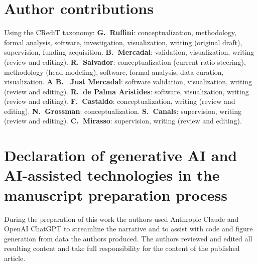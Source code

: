\documentclass[11pt,a4paper]{article}
\providecommand{\DIFaddtex}[1]{{\protect\color{blue} \sf #1}} %
\providecommand{\DIFdeltex}[1]{{\protect\color{red} \scriptsize #1}} %
\providecommand{\DIFaddbegin}{} %
\providecommand{\DIFaddend}{} %
\providecommand{\DIFdelbegin}{} %
\providecommand{\DIFdelend}{} %
\providecommand{\DIFadd}[1]{\texorpdfstring{\DIFaddtex{#1}}{#1}} %
\providecommand{\DIFdel}[1]{\texorpdfstring{\DIFdeltex{#1}}{}} %
\begin{document}
\section*{Author contributions}
Using the CRediT taxonomy: \textbf{G.~Ruffini}: conceptualization, methodology, formal
analysis, software, investigation, visualization, writing (original draft), supervision,
funding acquisition. \DIFdelbegin \DIFdel{\textbf{B.~Mercadal}: validation, visualization, writing (review
and editing). }\DIFdelend \textbf{R.~Salvador}: conceptualization (current-ratio steering),
methodology (head modeling), software, formal analysis, data curation, visualization.
\textbf{\DIFdelbegin \DIFdel{A}\DIFdelend \DIFaddbegin \DIFadd{B}\DIFaddend .~\DIFdelbegin \DIFdel{Just}\DIFdelend \DIFaddbegin \DIFadd{Mercadal}\DIFaddend }: \DIFdelbegin \DIFdel{software}\DIFdelend \DIFaddbegin \DIFadd{validation}\DIFaddend , visualization, writing (review and editing).
\textbf{R.~de Palma Aristides}: software, visualization, writing (review and editing).
\textbf{F.~Castaldo}: conceptualization, writing (review and editing).
\textbf{N.~Grossman}: conceptualization.
\textbf{S.~Canals}: supervision, writing (review and editing).
\textbf{C.~Mirasso}: supervision, writing (review and editing).
\fi

\section*{Declaration of generative AI and AI-assisted technologies in the manuscript
preparation process}
During the preparation of this work the authors used Anthropic Claude and OpenAI ChatGPT to
streamline the narrative and to assist with code and figure generation from data the authors
produced. The authors reviewed and edited all resulting content and take full responsibility
for the content of the published article.



\end{document}
